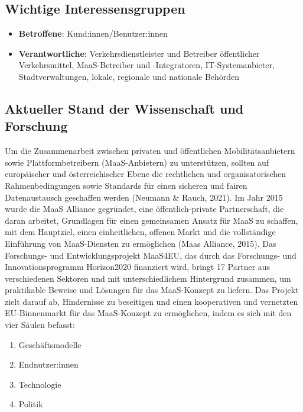 \documentclass[
]{book}
\providecommand{\tightlist}{%
  \setlength{\itemsep}{0pt}\setlength{\parskip}{0pt}}
\begin{document}
\hypertarget{wichtige-interessensgruppen-24}{%
\subsection*{Wichtige Interessensgruppen}\label{wichtige-interessensgruppen-24}}

\begin{itemize}
\tightlist
\item
  \textbf{Betroffene}: Kund:innen/Benutzer:innen
\item
  \textbf{Verantwortliche}: Verkehrsdienstleister und Betreiber öffentlicher Verkehrsmittel, MaaS-Betreiber und -Integratoren, IT-Systemanbieter, Stadtverwaltungen, lokale, regionale und nationale Behörden
\end{itemize}

\hypertarget{aktueller-stand-der-wissenschaft-und-forschung-24}{%
\subsection*{Aktueller Stand der Wissenschaft und Forschung}\label{aktueller-stand-der-wissenschaft-und-forschung-24}}

Um die Zusammenarbeit zwischen privaten und öffentlichen Mobilitätsanbietern sowie Plattformbetreibern (MaaS-Anbietern) zu unterstützen, sollten auf europäischer und österreichischer Ebene die rechtlichen und organisatorischen Rahmenbedingungen sowie Standards für einen sicheren und fairen Datenaustausch geschaffen werden (Neumann \& Rauch, 2021).
Im Jahr 2015 wurde die MaaS Alliance gegründet, eine öffentlich-private Partnerschaft, die daran arbeitet, Grundlagen für einen gemeinsamen Ansatz für MaaS zu schaffen, mit dem Hauptziel, einen einheitlichen, offenen Markt und die vollständige Einführung von MaaS-Diensten zu ermöglichen (Maas Alliance, 2015).
Das Forschungs- und Entwicklungsprojekt MaaS4EU, das durch das Forschungs- und Innovationsprogramm Horizon2020 finanziert wird, bringt 17 Partner aus verschiedenen Sektoren und mit unterschiedlichem Hintergrund zusammen, um praktikable Beweise und Lösungen für das MaaS-Konzept zu liefern. Das Projekt zielt darauf ab, Hindernisse zu beseitigen und einen kooperativen und vernetzten EU-Binnenmarkt für das MaaS-Konzept zu ermöglichen, indem es sich mit den vier Säulen befasst:

\begin{enumerate}
\def\labelenumi{(\arabic{enumi})}
\tightlist
\item
  Geschäftsmodelle
\item
  Endnutzer:innen
\item
  Technologie
\item
  Politik
\end{enumerate}
\end{document}
